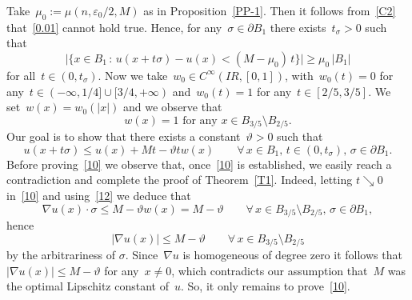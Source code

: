 \documentclass[11pt]{amsart}
\begin{document}
Take~$\mu_0:=\mu(n,{\varepsilon}_0/2,M)$ as
in Proposition~\ref{PP-1}. Then it follows from~\eqref{C2}
that~\eqref{0.01} cannot hold true.
Hence, for any~$\sigma\in \partial B_1$
there exists~$t_\sigma>0$
such that
\begin{equation}\label{09} \Big|\big\{x\in B_1 \,:\,
u(x+t \sigma)-u(x)< (M-\mu_0)\,t
\big\}\Big|{\geqslant}\mu_0\,|B_1|\end{equation}
for all~$t\in(0,t_\sigma)$.
Now we take~$w_0\in C^\infty({{I\!\!R}},[0,1])$, with~$w_0(t)=0$ for any~$t\in(-\infty,1/4]\cup[3/4,+\infty)$
and~$w_0(t)=1$ for any~$t\in[2/5,3/5]$. We set~$w(x)=w_0(|x|)$ and we observe that
\begin{equation}\label{12}
{\mbox{$w(x)=1$ for any~$x\in B_{3/5}\setminus B_{2/5}$.}}
\end{equation}
Our goal is to
show that there exists a constant~${\vartheta}>0$ such that
\begin{equation}\label{10}
u(x+t\sigma){\leqslant} u(x)+M t-{\vartheta} t w(x)\qquad \forall\,x\in B_1,\,t\in(0,t_\sigma),\,\sigma\in \partial B_1.
\end{equation}
Before proving~\eqref{10} we observe 
that, once~\eqref{10}
is established, we easily reach a contradiction and complete the proof
of Theorem~\ref{T1}. Indeed, letting $t \searrow0$ in~\eqref{10} and using~\eqref{12}
we deduce that
$$ \nabla u(x)\cdot\sigma{\leqslant} M -{\vartheta} w(x)=M-{\vartheta}\qquad \forall\,x\in B_{3/5}\setminus B_{2/5},\,\sigma\in \partial B_1,$$
hence
$$
|\nabla u(x)|{\leqslant} M-{\vartheta}\qquad \forall\,x\in B_{3/5}\setminus B_{2/5}
$$ by the arbitrariness of $\sigma$.
Since~$\nabla u$ is homogeneous of degree zero it follows that~$|\nabla u(x)|{\leqslant} M-{\vartheta}$
for any~$x\ne0$, which contradicts our assumption that~$M$ was the optimal Lipschitz
constant of~$u$.
So, it only remains to prove~\eqref{10}.
\end{document}
